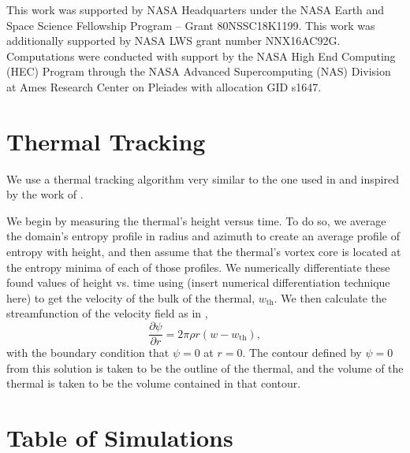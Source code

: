 \documentclass[twocolumn, amsmath, amsfonts, amssymb, trackchanges]{aastex62}
\begin{document}
\begin{acknowledgements}
This work was supported by NASA Headquarters under the NASA Earth and Space Science Fellowship Program -- Grant 80NSSC18K1199.
This work was additionally supported by  NASA LWS grant number NNX16AC92G.  
Computations were conducted with support by the NASA High End Computing (HEC) Program through the NASA  Advanced Supercomputing (NAS) Division at Ames Research Center on Pleiades with allocation GID s1647.
\end{acknowledgements}

\appendix
\section{Thermal Tracking}
\label{appendix:tracking}
We use a thermal tracking algorithm very similar to the one used in  \citet{lecoanet&jeevanjee2018} and inspired by the work of \citet{romps&all2015}. 

We begin by measuring the thermal's height versus time. 
To do so, we average the domain's entropy profile in radius and azimuth to create an average profile of entropy with height, and then assume that the thermal's vortex core is located at the entropy minima of each of those profiles.
We numerically differentiate these found values of height vs. time using (insert numerical differentiation technique here) to get the velocity of the bulk of the thermal, $w_{\text{th}}$.
We then calculate the streamfunction of the velocity field as in \citet{romps&all2015},
\begin{equation}
\frac{\partial \psi}{\partial r} = 2\pi \rho r (w - w_{\text{th}}),
\end{equation}
with the boundary condition that $\psi = 0$ at $r = 0$. 
The contour defined by $\psi = 0$ from this solution is taken to be the outline of the thermal, and the volume of the thermal is taken to be the volume contained in that contour.


\section{Table of Simulations}
\label{appendix:table}
\end{document}
